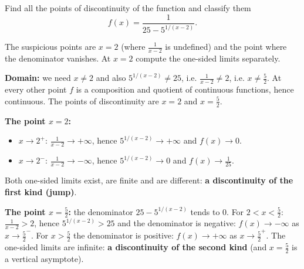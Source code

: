 
\begin{question}
Find all the points of discontinuity of the function and classify them
\[
f(x)=\frac{1}{25-5^{1/(x-2)}}.
\]
\end{question}

\begin{hint}
The suspicious points are $x=2$ (where $\frac1{x-2}$ is undefined) and the point where the denominator vanishes. At $x=2$ compute the one-sided limits separately.
\end{hint}

\begin{solution}
\textbf{Domain:} we need $x\neq2$ and also $5^{1/(x-2)}\neq25$, i.e. $\frac1{x-2}\neq2$, i.e. $x\neq\frac52$. At every other point $f$ is a composition and quotient of continuous functions, hence continuous. The points of discontinuity are $x=2$ and $x=\frac52$.

\textbf{The point $x=2$:}
\begin{itemize}
  \item $x\to2^+$: $\frac1{x-2}\to+\infty$, hence $5^{1/(x-2)}\to+\infty$ and $f(x)\to0$.
  \item $x\to2^-$: $\frac1{x-2}\to-\infty$, hence $5^{1/(x-2)}\to0$ and $f(x)\to\frac1{25}$.
\end{itemize}
Both one-sided limits exist, are finite and are different: \textbf{a discontinuity of the first kind (jump)}.

\textbf{The point $x=\frac52$:} the denominator $25-5^{1/(x-2)}$ tends to $0$. For $2<x<\frac52$: $\frac1{x-2}>2$, hence $5^{1/(x-2)}>25$ and the denominator is negative: $f(x)\to-\infty$ as $x\to\frac52^-$. For $x>\frac52$ the denominator is positive: $f(x)\to+\infty$ as $x\to\frac52^+$. The one-sided limits are infinite: \textbf{a discontinuity of the second kind} (and $x=\frac52$ is a vertical asymptote).
\end{solution}

